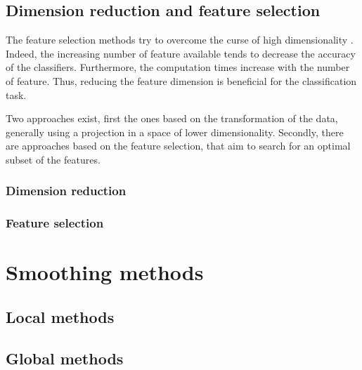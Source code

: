 \subsection{Dimension reduction and feature selection}
The feature selection methods try to overcome the curse of high dimensionality \citep{bellman2015adaptive, hughes1968mean}. Indeed, the increasing number of feature available tends to decrease the accuracy of the classifiers. Furthermore, the computation times increase with the number of feature. Thus, reducing the feature dimension is beneficial for the classification task.

Two approaches exist, first the ones based on the transformation of the data, generally using a projection in a space of lower dimensionality. Secondly, there are approaches based on the feature selection, that aim to search for an optimal subset of the features.

\subsubsection{Dimension reduction}

\subsubsection{Feature selection}

\section{Smoothing methods}

\subsection{Local methods}

\subsection{Global methods}
\stopcontents[chapters]

